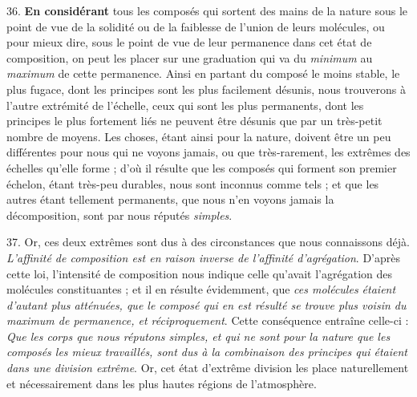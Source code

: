 \documentclass[a4paper, 11pt, oneside, polutonikogreek, french]{article}
\begin{document}
36. \textbf{En considérant} tous les composés qui sortent des mains de la nature sous le point de vue de la solidité ou de la faiblesse de l'union de leurs molécules, ou pour mieux dire, sous le point de vue de leur permanence dans cet état de composition, on peut les placer sur une graduation qui va du \emph{minimum} au \emph{maximum} de cette permanence. Ainsi en partant du composé le moins stable, le plus fugace, dont les principes sont les plus facilement désunis, nous trouverons à l'autre extrémité de l'échelle, ceux qui sont les plus permanents, dont les principes le plus fortement liés ne peuvent être désunis que par un très-petit nombre de moyens. Les choses, étant ainsi pour la nature, doivent être un peu différentes pour nous qui ne voyons jamais, ou que très-rarement, les extrêmes des échelles qu'elle forme ; d'où il résulte que les composés qui forment son premier échelon, étant très-peu durables, nous sont inconnus comme tels ; et que les autres étant tellement permanents, que nous n'en voyons jamais la décomposition, sont par nous réputés \emph{simples}.

37. Or, ces deux extrêmes sont dus à des circonstances que nous connaissons déjà. \emph{L'affinité de composition est en raison inverse de l'affinité d'agrégation}. D'après cette loi, l'intensité de composition nous indique celle qu'avait l'agrégation des molécules constituantes ; et il en résulte évidemment, que \emph{ces molécules étaient d'autant plus atténuées, que le composé qui en est résulté se trouve plus voisin du maximum de permanence, et réciproquement}. Cette conséquence entraîne celle-ci : \og \emph{Que les corps que nous réputons simples, et qui ne sont pour la nature que les composés les mieux travaillés, sont dus à la combinaison des principes qui étaient dans une division extrême}. Or, cet état d'extrême division les place naturellement et nécessairement dans les plus hautes régions de l'atmosphère. \fg
\end{document}
